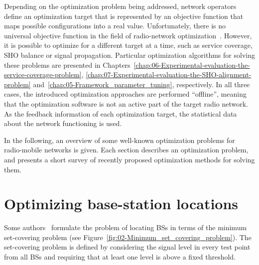 Depending on the optimization problem being addressed, network operators
define an optimization target that is represented by an objective
function that maps possible configurations into a real value. Unfortunately,
there is no universal objective function in the field of radio-network
optimization~\cite{Nawrocki-Understanding_UMTS_radio_network_modelling_and_optimisation:2006}.
However, it is possible to optimize for a different target at a time,
such as service coverage, SHO balance or signal propagation. Particular
optimization algorithms for solving these problems are presented in
Chapters~\ref{chap:06-Experimental-evaluation-the-service-coverage-problem},
\ref{chap:07-Experimental-evaluation-the-SHO-alignment-problem} and~\ref{chap:05-Framework_parameter_tuning},
respectively. In all three cases, the introduced optimization approaches
are performed ``offline'', meaning that the optimization software
is not an active part of the target radio network. As the feedback
information of each optimization target, the statistical data about
the network functioning is used.

\bigskip{}


In the following, an overview of some well-known optimization problems
for radio-mobile networks is given. Each section describes an optimization
problem, and presents a short survey of recently proposed optimization
methods for solving them.


\section{Optimizing base-station locations}

Some authors~\cite{minimum.set.covering.problem:1997,minimum.set.covering.problem:2000}
formulate the problem of locating BSs in terms of the minimum set-covering
problem (see Figure~\ref{fig:02-Minimum_set_covering_problem}).
The set-covering problem is defined by considering the signal level
in every test point from all BSs and requiring that at least one level
is above a fixed threshold.

